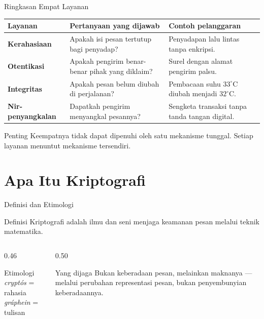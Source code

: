 \documentclass[aspectratio=169,11pt]{beamer}
\begin{document}
\begin{frame}{Ringkasan Empat Layanan}
    \footnotesize
    \begin{tabularx}{\linewidth}{@{}>{\bfseries}p{3.0cm} p{5.2cm} X@{}}
        \toprule
        Layanan & Pertanyaan yang dijawab & Contoh pelanggaran \\
        \midrule
        Kerahasiaan & Apakah isi pesan tertutup bagi penyadap? & Penyadapan lalu lintas tanpa enkripsi. \\
        \addlinespace
        Otentikasi & Apakah pengirim benar-benar pihak yang diklaim? & Surel dengan alamat pengirim palsu. \\
        \addlinespace
        Integritas & Apakah pesan belum diubah di perjalanan? & Pembacaan suhu $33^\circ$C diubah menjadi $32^\circ$C. \\
        \addlinespace
        Nir-penyangkalan & Dapatkah pengirim menyangkal pesannya? & Sengketa transaksi tanpa tanda tangan digital. \\
        \bottomrule
    \end{tabularx}
    \vspace{0.3cm}
    \begin{alertblock}{Penting}
        Keempatnya tidak dapat dipenuhi oleh satu mekanisme tunggal. Setiap
        layanan menuntut mekanisme tersendiri.
    \end{alertblock}
\end{frame}

\section{Apa Itu Kriptografi}

\begin{frame}{Definisi dan Etimologi}
    \begin{block}{Definisi}
        Kriptografi adalah ilmu dan seni menjaga keamanan pesan melalui teknik
        matematika.
    \end{block}
    \vspace{0.2cm}
    \begin{columns}[T,onlytextwidth]
        \begin{column}{0.46\textwidth}
            \begin{exampleblock}{Etimologi}
                \textit{crypt\'os} = rahasia\\
                \textit{gr\'aphein} = tulisan
            \end{exampleblock}
        \end{column}
        \begin{column}{0.50\textwidth}
            \begin{alertblock}{Yang dijaga}
                Bukan keberadaan pesan, melainkan maknanya --- melalui perubahan
                representasi pesan, bukan penyembunyian keberadaannya.
            \end{alertblock}
        \end{column}
    \end{columns}
\end{frame}
\end{document}
